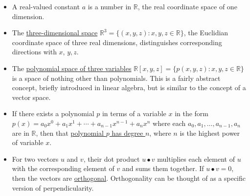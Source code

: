 \documentclass[letterpaper, 12pt]{article}
\begin{document}
\begin{itemize}
	\item A real-valued constant $a$ is a number in $\mathbb{R}$, the real coordinate space of one dimension.
	
	\vspace*{-3mm}
	\item The \underline{three-dimensional space} $\mathbb{R}^3 = \{(x,y,z) : x,y,z\in\mathbb{R}\}$, the Euclidian coordinate space of three real dimensions, distinguishes corresponding directions with $x$, $y, z$.
	
	\vspace*{-3mm}
	\item The \underline{polynomial space of three variables} $\mathbb{R}[x, y, z] = \{p(x,y,z) : x,y,z\in\mathbb{R}\}$ is a space of nothing other than polynomials. This is a fairly abstract concept, briefly introduced in linear algebra, but is similar to the concept of a vector space.
		
	\vspace*{-3mm}
	\item If there exists a polynomial $p$ in terms of a variable $x$ in the form $p(x) = a_0x^0 + a_1x^1 + \cdots + a_{n-1}x^{n-1} + a_nx^n$ where each $a_0, a_1, \ldots, a_{n-1}, a_n$ are in $\mathbb{R}$, then that \underline{polynomial $p$ has degree $n$}, where $n$ is the highest power of variable $x$.
			
	\vspace*{-3mm}
	\item For two vectors $u$ and $v$, their dot product $u \bullet v$ multiplies each element of $u$ with the corresponding element of $v$ and sums them together. If $u \bullet v = 0$, then the vectors are \underline{orthogonal}. Orthogonality can be thought of as a specific version of perpendicularity.
				

\end{itemize}
\end{document}
